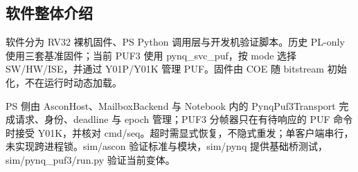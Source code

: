 \Needspace{85pt}

\subsection{软件整体介绍}

软件分为 RV32 裸机固件、PS Python 调用层与开发机验证脚本。历史 PL-only 使用三套基准固件；当前 PUF3 使用 pynq\_svc\_puf，按 mode 选择 SW/HW/ISE，并通过 Y01P/Y01K 管理 PUF。固件由 COE 随 bitstream 初始化，不在运行时动态加载。

PS 侧由 AsconHost、MailboxBackend 与 Notebook 内的 PynqPuf3Transport 完成请求、身份、deadline 与 epoch 管理；PUF3 分帧器只在有待响应的 PUF 命令时接受 Y01K，并核对 cmd/seq。超时需显式恢复，不隐式重发；单客户端串行，未实现跨进程锁。sim/ascon 验证标准与模块，sim/pynq 提供基础桥测试，sim/pynq\_puf3/run.py 验证当前变体。


